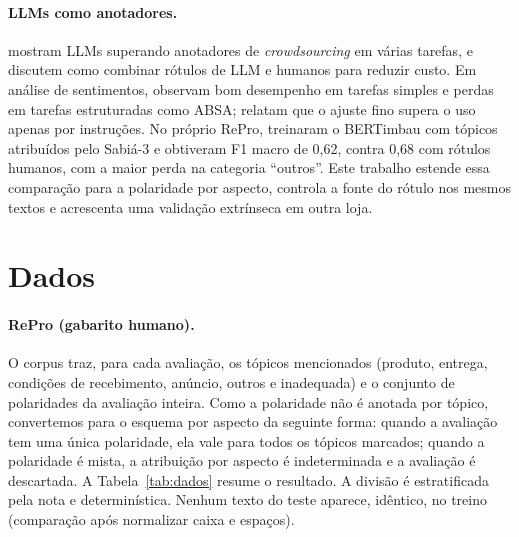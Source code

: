 \documentclass[a4paper, twocolumn, 11pt, twoside]{article}
\begin{document}
\paragraph{LLMs como anotadores.} \citet{gilardi2023chatgpt} mostram LLMs superando anotadores de \emph{crowdsourcing} em várias tarefas, e \citet{wang2021labeling} discutem como combinar rótulos de LLM e humanos para reduzir custo. Em análise de sentimentos, \citet{zhang2024realitycheck} observam bom desempenho em tarefas simples e perdas em tarefas estruturadas como ABSA; \citet{simmering2023llmabsa} relatam que o ajuste fino supera o uso apenas por instruções. No próprio RePro, \citet{silva2024sabia} treinaram o BERTimbau com tópicos atribuídos pelo Sabiá-3 \citep{abonizio2024sabia3} e obtiveram F1 macro de 0,62, contra 0,68 com rótulos humanos, com a maior perda na categoria ``outros''. Este trabalho estende essa comparação para a polaridade por aspecto, controla a fonte do rótulo nos mesmos textos e acrescenta uma validação extrínseca em outra loja.

\section{Dados}

\paragraph{RePro (gabarito humano).} O corpus traz, para cada avaliação, os tópicos mencionados (produto, entrega, condições de recebimento, anúncio, outros e inadequada) e o conjunto de polaridades da avaliação inteira. Como a polaridade não é anotada por tópico, convertemos para o esquema por aspecto da seguinte forma: quando a avaliação tem uma única polaridade, ela vale para todos os tópicos marcados; quando a polaridade é mista, a atribuição por aspecto é indeterminada e a avaliação é descartada. A Tabela~\ref{tab:dados} resume o resultado. A divisão é estratificada pela nota e determinística. Nenhum texto do teste aparece, idêntico, no treino (comparação após normalizar caixa e espaços).
\end{document}
